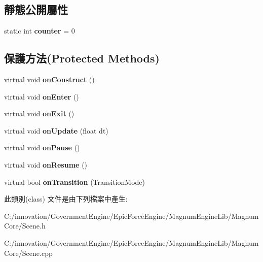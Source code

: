 \subsection*{靜態公開屬性}
\begin{DoxyCompactItemize}
\item 
static int {\bfseries counter} = 0\hypertarget{class_i_dream_sky_1_1_scene_a8a0ac630a1cbd25aa67d1956418f7b1a}{}\label{class_i_dream_sky_1_1_scene_a8a0ac630a1cbd25aa67d1956418f7b1a}

\end{DoxyCompactItemize}
\subsection*{保護方法(Protected Methods)}
\begin{DoxyCompactItemize}
\item 
virtual void {\bfseries on\+Construct} ()\hypertarget{class_i_dream_sky_1_1_scene_a12971ac654728ff57d88d21d94f26e6b}{}\label{class_i_dream_sky_1_1_scene_a12971ac654728ff57d88d21d94f26e6b}

\item 
virtual void {\bfseries on\+Enter} ()\hypertarget{class_i_dream_sky_1_1_scene_a6ffdd410632cb9a58a77b21ab0b54b93}{}\label{class_i_dream_sky_1_1_scene_a6ffdd410632cb9a58a77b21ab0b54b93}

\item 
virtual void {\bfseries on\+Exit} ()\hypertarget{class_i_dream_sky_1_1_scene_a41f133617b2298d01f1925306909fefc}{}\label{class_i_dream_sky_1_1_scene_a41f133617b2298d01f1925306909fefc}

\item 
virtual void {\bfseries on\+Update} (float dt)\hypertarget{class_i_dream_sky_1_1_scene_ade05fe1ee246f4da8fb35770be5e97f6}{}\label{class_i_dream_sky_1_1_scene_ade05fe1ee246f4da8fb35770be5e97f6}

\item 
virtual void {\bfseries on\+Pause} ()\hypertarget{class_i_dream_sky_1_1_scene_ad0b1d9259cb148277401ccd88850ad1f}{}\label{class_i_dream_sky_1_1_scene_ad0b1d9259cb148277401ccd88850ad1f}

\item 
virtual void {\bfseries on\+Resume} ()\hypertarget{class_i_dream_sky_1_1_scene_ab81499e895fbc5601910e7b214edb151}{}\label{class_i_dream_sky_1_1_scene_ab81499e895fbc5601910e7b214edb151}

\item 
virtual bool {\bfseries on\+Transition} (Transition\+Mode)\hypertarget{class_i_dream_sky_1_1_scene_ac1fe7a1a20b9e66abe6181f98efac68e}{}\label{class_i_dream_sky_1_1_scene_ac1fe7a1a20b9e66abe6181f98efac68e}

\end{DoxyCompactItemize}


此類別(class) 文件是由下列檔案中產生\+:\begin{DoxyCompactItemize}
\item 
C\+:/innovation/\+Government\+Engine/\+Epic\+Force\+Engine/\+Magnum\+Engine\+Lib/\+Magnum\+Core/Scene.\+h\item 
C\+:/innovation/\+Government\+Engine/\+Epic\+Force\+Engine/\+Magnum\+Engine\+Lib/\+Magnum\+Core/Scene.\+cpp\end{DoxyCompactItemize}

